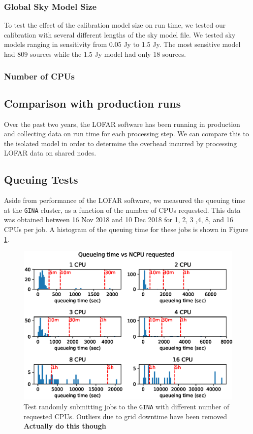 \documentclass[preprint,5p]{elsarticle}
\begin{document}
\subsubsection{Global Sky Model Size}
To test the effect of the calibration model size on run time, we tested our calibration with several different lengths of the sky model file. We tested sky models ranging in sensitivity from 0.05 Jy to 1.5 Jy. The most sensitive model had 809 sources while the 1.5 Jy model had only 18 sources. 


\subsubsection{Number of CPUs}



\subsection{Comparison with production runs}
Over the past two years, the LOFAR software has been running in production and collecting data on run time for each processing step. We can compare this to the isolated model in order to determine the overhead incurred by processing LOFAR data on shared nodes. 

\subsection{Queuing Tests}

Aside from performance of the LOFAR software, we measured the queuing time at the \texttt{GINA} cluster, as a function of the number of CPUs requested. This data was obtained between 16 Nov 2018 and 10 Dec 2018 for 1, 2, 3 ,4, 8, and 16 CPUs per job. A histogram of the queuing time for these jobs is shown in Figure \ref{fig:queue_NCPU}.

\begin{figure}
    \includegraphics[width=0.95\linewidth]{figures/Queue_NCPU.eps}
      \caption{Test randomly submitting jobs to the \texttt{GINA} with different number of requested CPUs. Outliers due to grid downtime have been removed \textbf{Actually do this though} }
	\label{fig:queue_NCPU}
\end{figure}
\end{document}
